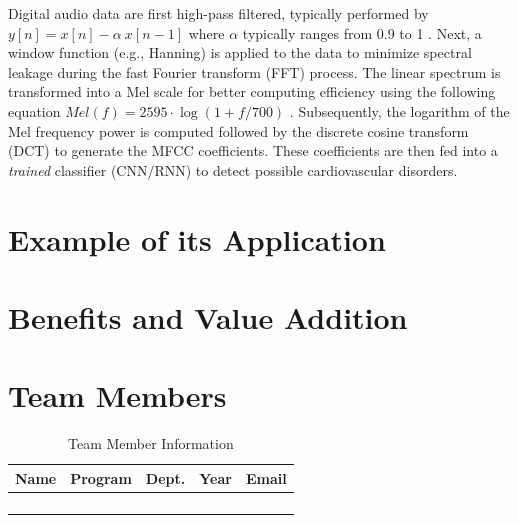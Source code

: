 \documentclass[12pt]{article}
\begin{document}
Digital audio data are first high-pass filtered, typically performed by $y[n] = x[n] - \alpha~x[n-1]$ where $\alpha$ typically ranges from 0.9 to 1 \cite{han2006efficient}.
Next, a window function (e.g., Hanning) is applied to the data to minimize spectral leakage during the fast Fourier transform (FFT) process. The linear spectrum is transformed into a Mel scale for better computing efficiency using the following equation $Mel(f) = 2595\cdot \log(1 + f/700)$ \cite{han2006efficient}.
Subsequently, the logarithm of the Mel frequency power is computed followed by the discrete cosine transform (DCT) to generate the MFCC coefficients. These coefficients are then fed into a \textit{trained} classifier (CNN/RNN) to detect possible cardiovascular disorders.

 
\section{Example of its Application}


\section{Benefits and Value Addition}




\section{Team Members}
\begin{table}[h]
    \centering
    \begin{tabular}{|c|c|c|c|c|}
        \hline
        \textbf{Name} & \textbf{Program} & \textbf{Dept.} & \textbf{Year} & \textbf{Email} \\ \hline\hline
        & & & & \\ \hline
        & & & & \\ \hline
        & & & & \\ \hline
        & & & & \\ \hline
    \end{tabular}
    \caption{Team Member Information}
    \label{tab:student_info}
\end{table}
\end{document}
